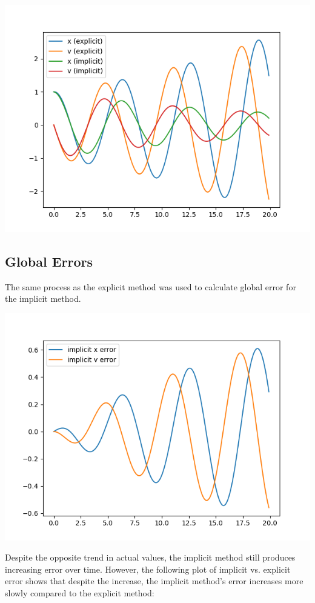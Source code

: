 \documentclass{article}
\begin{document}
\includegraphics[scale=0.9]{images/implicit_vs_explicit.png}

\subsection{Global Errors}
The same process as the explicit method was used to calculate global error for the implicit method.

\includegraphics[scale=0.9]{images/implicit_error.png}

Despite the opposite trend in actual values, the implicit method still produces increasing error over time. However, the following plot of implicit vs. explicit error shows that despite the increase, the implicit method's error increases more slowly compared to the explicit method:
\end{document}
